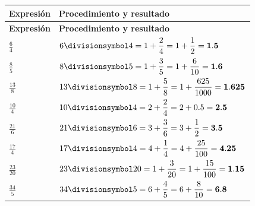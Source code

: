 \documentclass[spanish,letterpaper,oneside]{article}
\let\div\divisionsymbol
\begin{document}
{\small{}\renewcommand{\arraystretch}{1.32}
\begin{longtable}{|>{\raggedright\arraybackslash}p{}|>{\raggedright\arraybackslash}p{}|}\hline
\rowcolor{iiiepePale} \textbf{Expresión} & \textbf{Procedimiento y resultado} \\\hline
\endfirsthead
\hline
\rowcolor{iiiepePale} \textbf{Expresión} & \textbf{Procedimiento y resultado} \\\hline
\endhead
$\frac{6}{4}$ & $6\div 4 = 1+\dfrac{2}{4} = 1+\dfrac{1}{2} = \mathbf{1.5}$ \\\hline
$\frac{8}{5}$ & $8\div 5 = 1+\dfrac{3}{5} = 1+\dfrac{6}{10} = \mathbf{1.6}$ \\\hline
$\frac{13}{8}$ & $13\div 8 = 1+\dfrac{5}{8} = 1+\dfrac{625}{1000} = \mathbf{1.625}$ \\\hline
$\frac{10}{4}$ & $10\div 4 = 2+\dfrac{2}{4} = 2+0.5 = \mathbf{2.5}$ \\\hline
$\frac{21}{6}$ & $21\div 6 = 3+\dfrac{3}{6} = 3+\dfrac{1}{2} = \mathbf{3.5}$ \\\hline
$\frac{17}{4}$ & $17\div 4 = 4+\dfrac{1}{4} = 4+\dfrac{25}{100} = \mathbf{4.25}$ \\\hline
$\frac{23}{20}$ & $23\div 20 = 1+\dfrac{3}{20} = 1+\dfrac{15}{100} = \mathbf{1.15}$ \\\hline
$\frac{34}{5}$ & $34\div 5 = 6+\dfrac{4}{5} = 6+\dfrac{8}{10} = \mathbf{6.8}$ \\\hline
\end{longtable}}
\end{document}
